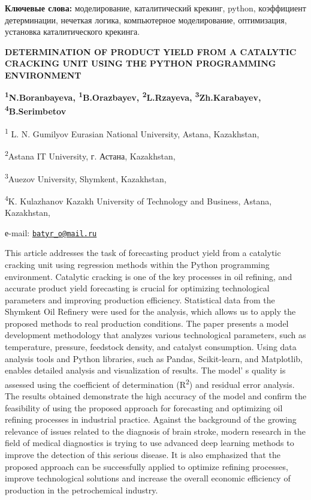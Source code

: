 {\bfseries Ключевые слова:} моделирование, каталитический крекинг, python,
коэффициент детерминации, нечеткая логика, компьютерное моделирование,
оптимизация, установка каталитического крекинга.

\begin{articleheader}
{\bfseries DETERMINATION OF PRODUCT YIELD FROM A CATALYTIC CRACKING UNIT
USING THE PYTHON PROGRAMMING ENVIRONMENT}

{\bfseries \textsuperscript{1}N.Boranbayeva,
\textsuperscript{1}B.Orazbayev\textsuperscript{\envelope },
\textsuperscript{2}L.Rzayeva, \textsuperscript{3}Zh.Karabayev,
\textsuperscript{4}B.Serimbetov}
\end{articleheader}

\begin{affiliation}
\textsuperscript{1} L. N. Gumilyov Eurasian National University, Astana,
Kazakhstan,

\textsuperscript{2}Astana IT University, г. Астана, Kazakhstan,

\textsuperscript{3}Auezov University, Shymkent, Kazakhstan,

\textsuperscript{4}K. Kulazhanov Kazakh University of Technology and
Business, Astana, Kazakhstan,

е-mail: \href{mailto:batyr_o@mail.ru}{\nolinkurl{batyr\_o@mail.ru}}
\end{affiliation}

This article addresses the task of forecasting product yield from a
catalytic cracking unit using regression methods within the Python
programming environment. Catalytic cracking is one of the key processes
in oil refining, and accurate product yield forecasting is crucial for
optimizing technological parameters and improving production efficiency.
Statistical data from the Shymkent Oil Refinery were used for the
analysis, which allows us to apply the proposed methods to real
production conditions. The paper presents a model development
methodology that analyzes various technological parameters, such as
temperature, pressure, feedstock density, and catalyst consumption.
Using data analysis tools and Python libraries, such as Pandas,
Scikit-learn, and Matplotlib, enables detailed analysis and
visualization of results. The model' s quality is
assessed using the coefficient of determination (R\textsuperscript{2})
and residual error analysis. The results obtained demonstrate the high
accuracy of the model and confirm the feasibility of using the proposed
approach for forecasting and optimizing oil refining processes in
industrial practice. Against the background of the growing relevance of
issues related to the diagnosis of brain stroke, modern research in the
field of medical diagnostics is trying to use advanced deep learning
methods to improve the detection of this serious disease. It is also
emphasized that the proposed approach can be successfully applied to
optimize refining processes, improve technological solutions and
increase the overall economic efficiency of production in the
petrochemical industry.

